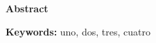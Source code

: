 \thispagestyle{plain}
\begin{center}
	\vspace*{1.5cm}
	{\Large \bfseries  Abstract}
\end{center}
\vspace{0.5cm}

\newline

\textbf{Keywords: } uno, dos, tres, cuatro